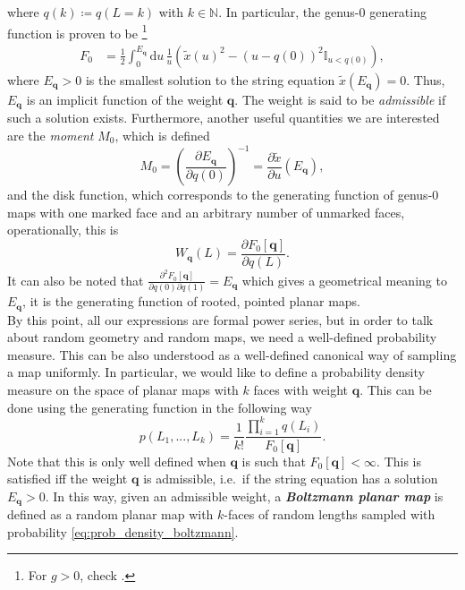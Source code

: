 \documentclass[a4paper,11pt]{article}
\newcommand{\rmd}{\mathrm{d}}
\begin{document}
where $q(k)\coloneqq q(L=k)$ with $k\in \mathbb{N}$. In particular, the genus-$0$ generating function is proven to be \cite{Tutte1968OnTE,Eynard:2016yaa}\footnote{For $g>0$, check \cite{Eynard:2016yaa}.}
\begin{align}
    F_0 &= \frac{1}{2}\int_{0}^{E_\mathbf{q}} \!\!\!\rmd u\,\frac{1}{u} \left(\tilde{x}(u)^2 -(u-q(0))^2 \mathbb{I}_{u<q(0)} \right),\label{eq:genfun0beta}
\end{align}
where $E_\mathbf{q}>0$ is the smallest solution to the string equation $\tilde{x}(E_\mathbf{q})=0$. Thus, $E_\mathbf{q}$ is an implicit function of the weight $\mathbf{q}$. The weight is said to be \textit{admissible} if such a solution exists. Furthermore, another useful quantities we are interested are the \textit{moment} $M_0$, which is defined 
\begin{equation}
M_0=\left(\frac{\partial E_\mathbf{q}}{\partial q(0)}\right)^{-1}=\frac{\partial \tilde{x}}{\partial u}(E_\mathbf{q}),
\end{equation}
and the disk function, which corresponds to the generating function of genus-$0$ maps with one marked face and an arbitrary number of unmarked faces, operationally, this is 
\begin{equation}
    W_\mathbf{q}(L) = \frac{\partial 	F_0[\mathbf{q}]}{\partial q(L)}.
\end{equation}
It can also be noted that
$\frac{\partial^2	F_0[\mathbf{q}]}{\partial q(0)\partial q(1)}=E_\mathbf{q}
$
which gives a geometrical meaning to $E_\mathbf{q}$, it is the generating function of rooted, pointed planar maps.\\
By this point, all our expressions are formal power series, but in order to talk about random geometry and random maps, we need a well-defined probability measure. This can be also understood as a well-defined canonical way of sampling a map uniformly. In particular, we would like to define a probability density measure on the space of planar maps with $k$ faces with weight $\mathbf{q}$. This can be done using the generating function in the following way   
\begin{equation}
    p\left(L_1, ... , L_k\right) = \frac{1}{k!} \frac{\prod_{i=1}^{k} q(L_i)}{F_0[\mathbf{q}]}.
\label{eq:prob_density_boltzmann}
\end{equation}
Note that this is only well defined when $\mathbf{q}$ is such that $F_0[\mathbf{q}]<\infty$. This is satisfied iff the weight $\mathbf{q}$ is admissible, i.e.\, if the string equation has a solution $E_\mathbf{q}>0$. In this way, given an admissible weight, a \textbf{\textit{Boltzmann planar map}} is defined as a random planar map with $k$-faces of random lengths sampled with probability \eqref{eq:prob_density_boltzmann}.
\end{document}
